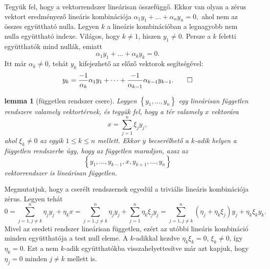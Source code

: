 \documentclass[9pt, showtrims]{memoir}
\makeatletter
\renewenvironment{proof}[1][\proofname]
    {\par\pushQED{\qed}%
    \normalfont \topsep6\p@\@plus6\p@\relax
    \trivlist
    \item[\hskip\labelsep
        \itshape
    #1\@addpunct{:}]\ignorespaces}
    {\popQED\endtrivlist\@endpefalse}
\theoremstyle{plain}
\newtheorem{lemma}[proposition]{lemma}
\theoremstyle{remark}
\theoremstyle{definition}
\makeatother
\begin{document}
\begin{proof}
    Tegyük fel, hogy a vektorrendszer lineárisan összefüggő.
    Ekkor van olyan a zérus vektort eredményező lineáris kombinációja
    \(
    \alpha_1y_1+\dots+\alpha_ny_n=0,
    \)
    ahol nem az összes együttható nulla.
    Legyen $k$ a lineáris kombinációban a legnagyobb nem nulla együttható indexe.
    Világos, hogy $k\neq 1$, 
    hiszen $y_1\neq 0$.
    Persze a $k$ feletti együtthatók mind nullák,
    emiatt
    \[
        \alpha_1y_1+\dots+\alpha_ky_k=0.
    \]
    Itt már $\alpha_k\neq 0$, tehát $y_k$ kifejezhető az előző vektorok segítségével:
    \[
        y_k=
        \frac{-1}{\alpha_k}\alpha_1y_1+\dots+\frac{-1}{\alpha_{k-1}}\alpha_{k-1}y_{k-1}.\qedhere
    \]
\end{proof}

\begin{lemma}[független rendszer csere]\label{le:fgtlncsere}
    Legyen $\left\{ y_1,\dots,y_n \right\}$ egy lineárisan független rendszere valamely vektortérnek,
    és tegyük fel, hogy a tér valamely $x$ vektorára
    \[
        x=\sum_{j=1}^n\xi_jy_j,
    \]
    ahol $\xi_k\neq 0$ az egyik $1\leq k\leq n$ mellett. 
    Ekkor $y$ becserélhető a $k$-adik helyen a független rendszerbe 
    úgy, hogy az független maradjon, azaz az
    \[
        \left\{ y_1,\dots,y_{k-1},x,y_{k+1},\dots,y_n \right\}
    \]
    vektorrendszer is lineárisan független.
\end{lemma}
\begin{proof}
    Megmutatjuk, hogy a cserélt rendszernek egyedül a triviális lineáris kombinációja zérus.
    Legyen tehát
    \[
        0
        =\sum_{j=1,j\neq k}^n\eta_jy_j+\eta_kx
        =\sum_{j=1,j\neq k}^n\eta_jy_j+\sum_{j=1}^n\eta_k\xi_jy_j
        =\sum_{j=1,j\neq k}^n\left( \eta_j+\eta_k\xi_j \right)y_j+\eta_k\xi_ky_k.
    \]
    Mivel az eredeti rendszer lineárisan független,
    ezért az utóbbi lineáris kombináció minden együtthatója a test null eleme.
    A $k$-adikkal kezdve $\eta_k\xi_k=0$, $\xi_k\neq 0$, így $\eta_k=0$.
    Ezt a nem $k$-adik együtthatókba visszahelyettesítve
    már azt kapjuk, hogy $\eta_j=0$ minden $j\neq k$ mellett is.
\end{proof}
\end{document}
